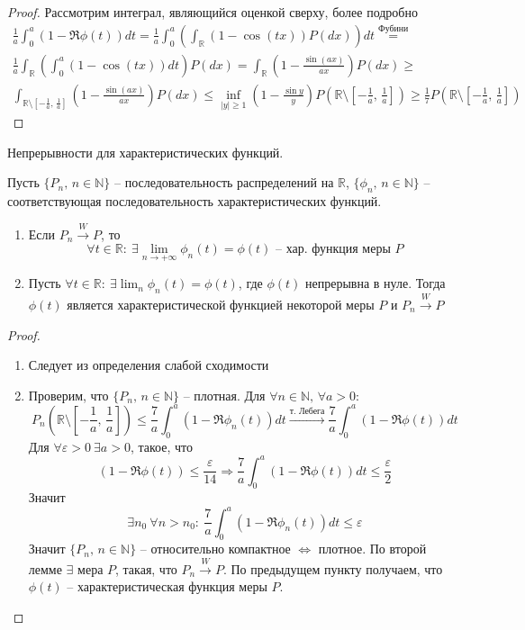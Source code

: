 \begin{proof}
	Рассмотрим интеграл, являющийся оценкой сверху, более подробно
	\begin{align*}
		\frac{1}{a}\int_0^a (1 - \Re\phi(t))dt = \frac{1}{a}\int_0^a \left(\int_\mathbb{R} (1 - \cos(tx))P(dx)\right)dt \stackrel{\text{Фубини}}{=} \\
		\frac{1}{a}\int_\mathbb{R}\left(\int_0^a (1 - \cos(tx))dt\right)P(dx) = \int_\mathbb{R}\left(1 - \frac{\sin(ax)}{ax}\right)P(dx) \geq       \\
		\int_{\mathbb{R} \setminus [-\frac{1}{a},\,\frac{1}{a}]}\left(1 - \frac{\sin(ax)}{ax}\right)P(dx) \leq \inf_{|y| \geq 1}\left(1 - \frac{\sin y}{y}\right)P\left(\mathbb{R} \setminus \left[-\frac{1}{a},\,\frac{1}{a}\right]\right) \geq \frac{1}{7}P\left(\mathbb{R} \setminus\left[-\frac{1}{a},\,\frac{1}{a}\right]\right)
	\end{align*}
\end{proof}

\begin{theorem}
	Непрерывности для характеристических функций.

	Пусть $\{P_n,\, n \in \mathbb{N}\}$ -- последовательность распределений на $\mathbb{R}$, $\{\phi_n,\, n \in \mathbb{N}\}$ -- соответствующая последовательность характеристических функций.
	\begin{enumerate}
		\item Если $P_n \stackrel{W}{\to} P$, то
		      \[\forall t \in \mathbb{R} :\: \exists\lim_{n \to +\infty} \phi_n(t) = \phi(t) \text{ -- хар. функция меры }P\]
		\item Пусть $\forall t \in \mathbb{R} :\: \exists \lim_n \phi_n(t) = \phi(t)$, где $\phi(t)$ непрерывна в нуле. Тогда $\phi(t)$ является характеристической функцией некоторой меры $P$ и $P_n \stackrel{W}{\to} P$
	\end{enumerate}
\end{theorem}

\begin{proof}
	\begin{enumerate}
		\item Следует из определения слабой сходимости
		\item Проверим, что $\{P_n,\, n \in \mathbb{N}\}$ -- плотная.
		      Для $\forall n \in \mathbb{N},\, \forall a > 0$:
		      \[P_n\left(\mathbb{R}\setminus\left[-\frac{1}{a},\,\frac{1}{a}\right]\right) \leq \frac{7}{a}\int_0^a (1 - \Re\phi_n(t))dt \stackrel{\text{т. Лебега}}{\to} \frac{7}{a}\int_0^a(1 - \Re\phi(t))dt\]
		      Для $\forall \varepsilon > 0 \: \exists a > 0$, такое, что
		      \[(1 - \Re\phi(t)) \leq \frac{\varepsilon}{14} \Rightarrow \frac{7}{a}\int_0^a (1 - \Re\phi(t))dt \leq \frac{\varepsilon}{2}\]
		      Значит
		      \[\exists n_0 \: \forall n > n_0 :\: \frac{7}{a}\int_0^a (1 - \Re\phi_n(t))dt \leq \varepsilon \]
		      Значит $\{P_n,\, n \in \mathbb{N}\}$ -- относительно компактное $\Leftrightarrow$ плотное. По второй лемме $\exists$ мера $P$, такая, что $P_n \stackrel{W}{\to} P$. По предыдущем пункту получаем, что $\phi(t)$ -- характеристическая функция меры $P$.
	\end{enumerate}
\end{proof}
